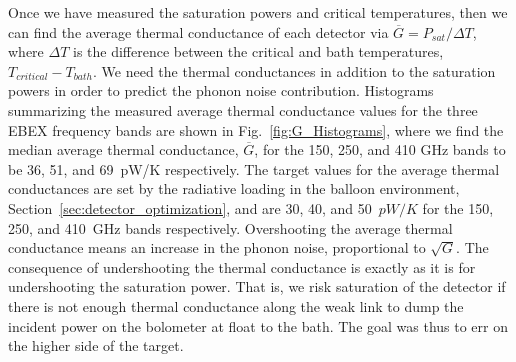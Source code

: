 Once we have measured the saturation powers and critical temperatures, then we can find the average thermal conductance of each detector via $\overline{G} = P_{sat}/\Delta T$, where $\Delta T$ is the difference between the critical and bath temperatures, $T_{critical} - T_{bath}$. 
We need the thermal conductances in addition to the saturation powers in order to predict the phonon noise contribution. 
Histograms summarizing the measured average thermal conductance values for the three \ac{EBEX} frequency bands are shown in Fig.~\ref{fig:G_Histograms}, where we find the median average thermal conductance, $\overline{G}$, for the 150, 250, and 410 GHz bands to be 36, 51, and 69~pW/K respectively. 
The target values for the average thermal conductances are set by the radiative loading in the balloon environment, Section~\ref{sec:detector_optimization}, and are 30, 40, and 50~$pW/K$ for the 150, 250, and 410~GHz bands respectively. 
Overshooting the average thermal conductance means an increase in the phonon noise, proportional to $\sqrt{G}$. 
The consequence of undershooting the thermal conductance is exactly as it is for undershooting the saturation power. 
That is, we risk saturation of the detector if there is not enough thermal conductance along the weak link to dump the incident power on the bolometer at float to the bath. 
The goal was thus to err on the higher side of the target. 



